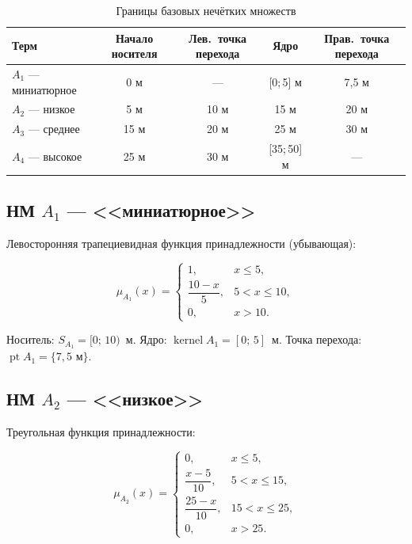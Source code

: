 \documentclass[14pt,a4paper]{extarticle}
\begin{document}
\begin{table}[H]
    \centering
    \caption{Границы базовых нечётких множеств}
    \begin{tabular}{lcccc}
        \toprule
        \textbf{Терм} &
        \textbf{Начало носителя} &
        \textbf{Лев.~точка перехода} &
        \textbf{Ядро} &
        \textbf{Прав.~точка перехода} \\
        \midrule
        $A_1$ --- миниатюрное & 0 м   & ---    & [0;\,5] м  & 7{,}5 м \\
        $A_2$ --- низкое      & 5 м   & 10 м   & 15 м       & 20 м    \\
        $A_3$ --- среднее     & 15 м  & 20 м   & 25 м       & 30 м    \\
        $A_4$ --- высокое     & 25 м  & 30 м   & [35;\,50] м & ---    \\
        \bottomrule
    \end{tabular}
\end{table}

\subsection{НМ \texorpdfstring{$A_1$}{A1} --- <<миниатюрное>>}

Левосторонняя трапециевидная функция принадлежности (убывающая):

\begin{equation}
    \mu_{A_1}(x) =
    \begin{cases}
        1, & x \leq 5, \\[4pt]
        \dfrac{10 - x}{5}, & 5 < x \leq 10, \\[8pt]
        0, & x > 10.
    \end{cases}
\end{equation}

\noindent
Носитель: $S_{A_1} = [0;\,10)$~м.
Ядро: $\operatorname{kernel} A_1 = [0;\,5]$~м.
Точка перехода: $\operatorname{pt} A_1 = \{7{,}5 \text{ м}\}$.

\subsection{НМ \texorpdfstring{$A_2$}{A2} --- <<низкое>>}

Треугольная функция принадлежности:

\begin{equation}
    \mu_{A_2}(x) =
    \begin{cases}
        0, & x \leq 5, \\[4pt]
        \dfrac{x - 5}{10}, & 5 < x \leq 15, \\[8pt]
        \dfrac{25 - x}{10}, & 15 < x \leq 25, \\[8pt]
        0, & x > 25.
    \end{cases}
\end{equation}
\end{document}
